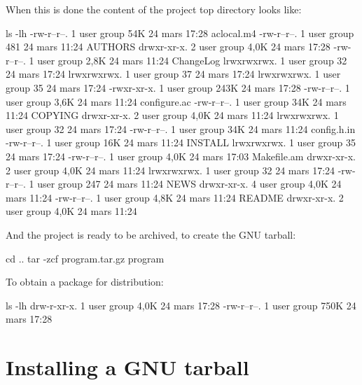 \vspace{-0.5cm}
When this is done the content of the project top directory looks like:
{\footnotesize{
\begin{script}
 ls -lh
-rw-r--r--.  1 user group  54K 24 mars  17:28 aclocal.m4
-rw-r--r--.  1 user group  481 24 mars  11:24 AUTHORS
drwxr-xr-x.  2 user group 4,0K 24 mars  17:28 
-rw-r--r--.  1 user group 2,8K 24 mars  11:24 ChangeLog
lrwxrwxrwx.  1 user group   32 24 mars  17:24 
lrwxrwxrwx.  1 user group   37 24 mars  17:24 
lrwxrwxrwx.  1 user group   35 24 mars  17:24 
-rwxr-xr-x.  1 user group 243K 24 mars  17:28 
-rw-r--r--.  1 user group 3,6K 24 mars  11:24 configure.ac
-rw-r--r--.  1 user group  34K 24 mars  11:24 COPYING
drwxr-xr-x.  2 user group 4,0K 24 mars  11:24 
lrwxrwxrwx.  1 user group   32 24 mars  17:24 
-rw-r--r--.  1 user group  34K 24 mars  11:24 config.h.in
-rw-r--r--.  1 user group  16K 24 mars  11:24 INSTALL
lrwxrwxrwx.  1 user group   35 24 mars  17:24 
-rw-r--r--.  1 user group 4,0K 24 mars  17:03 Makefile.am
drwxr-xr-x.  2 user group 4,0K 24 mars  11:24 
lrwxrwxrwx.  1 user group   32 24 mars  17:24 
-rw-r--r--.  1 user group  247 24 mars  11:24 NEWS
drwxr-xr-x.  4 user group 4,0K 24 mars  11:24 
-rw-r--r--.  1 user group 4,8K 24 mars  11:24 README
drwxr-xr-x.  2 user group 4,0K 24 mars  11:24 
\end{script}
}}
And the project is ready to be archived, to create the GNU tarball:
{\footnotesize{
\begin{script}
 cd ..
\fprompt{~} tar -zcf program.tar.gz program
\end{script}
}}
To obtain a package for distribution:
{\footnotesize{
\begin{script}
\fprompt{~} ls -lh
drw-r-xr-x.  1 user group  4,0K 24 mars  17:28 
-rw-r--r--.  1 user group  750K 24 mars  17:28 
\end{script}
}}

\section{Installing a GNU tarball}

